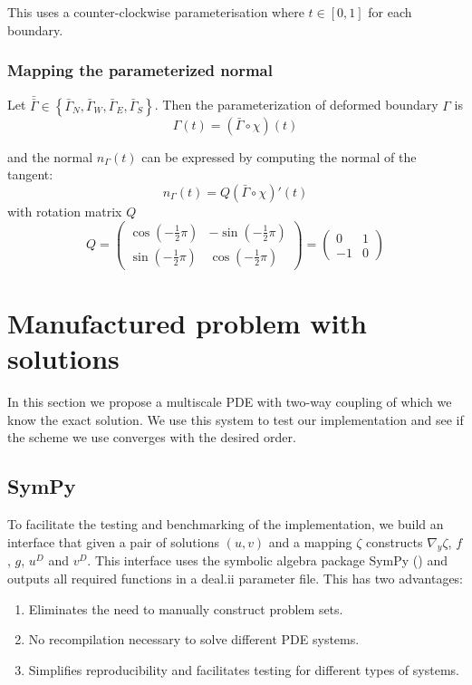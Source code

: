 \documentclass{article}
\newcommand{\dealii}{deal.ii{}}
\begin{document}
This uses a counter-clockwise parameterisation where $t \in [0,1]$ for each boundary.

\subsubsection{Mapping the parameterized normal}

Let $\bar{\bar{\Gamma}} \in  \left\{ \bar{\Gamma}_N, \bar{\Gamma}_W, \bar{\Gamma}_E, \bar{\Gamma}_S  \right\}$. Then the parameterization of deformed boundary $\Gamma$ is
\begin{equation}
    \Gamma(t) = \left(\bar{\Gamma} \circ \chi \right)(t)
\end{equation}

and the normal $n_\Gamma(t)$ can be expressed by computing the normal of the tangent:
\begin{equation}
    n_\Gamma(t) = Q \left(\bar{\Gamma} \circ \chi \right)'(t)
\end{equation}
with rotation matrix $Q$
\begin{equation}
    Q = \begin{pmatrix}
        \cos( - \frac{1}{2} \pi) &- \sin ( - \frac{1}{2} \pi) \\
        \sin( - \frac{1}{2} \pi) & \cos ( - \frac{1}{2} \pi)
    \end{pmatrix} =
    \begin{pmatrix}
        0 & 1 \\
        -1 & 0
    \end{pmatrix}
\end{equation}
\section{Manufactured problem with solutions}
\label{sec:manufactured}
In this section we propose a multiscale PDE with two-way coupling of which we know the exact solution. We use this system to test our implementation and see if the scheme we use converges with the desired order.
\subsection{SymPy}
To facilitate the testing and benchmarking of the implementation, we build an interface that given a pair of solutions $(u,v)$ and a mapping $\zeta$ constructs $\nabla_y \zeta$, $f$, $g$, $u^D$ and $v^D$.
This interface uses the symbolic algebra package SymPy (\cite{sympy}) and outputs all required functions in a \dealii{} parameter file. This has two advantages:
\begin{enumerate}
    \item Eliminates the need to manually construct problem sets.
    \item No recompilation necessary to solve different PDE systems.
    \item Simplifies reproducibility and facilitates testing for different types of systems.
\end{enumerate}
\end{document}
